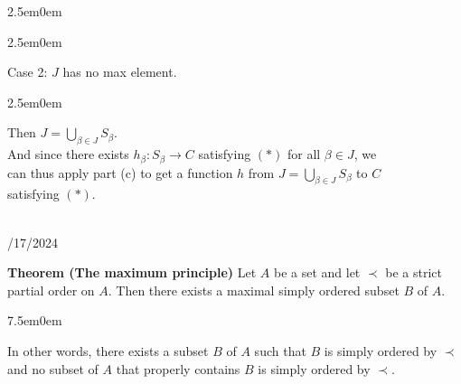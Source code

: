 \documentclass{book}
\newcommand{\hOne}{%
   \color{Black}%
   \fontsize{14}{16}\selectfont%
}
\newcommand{\hThree}{%
   \color{Black}%
   \fontsize{12}{14}\selectfont%
}
\newenvironment{myIndent}{%
   \begin{adjustwidth}{2.5em}{0em}%
}{%
   \end{adjustwidth}%
}
\newenvironment{myTindent}{%
   \begin{adjustwidth}{7.5em}{0em}%
}{%
   \end{adjustwidth}%
}
\newcommand{\blab}[1]{\textbf{#1}}
\newcommand{\mySepTwo}[1][.]{%
   {\noindent\color{#1}{\rule{6.5in}{0.5mm}}}\\%
}
\newcommand{\retTwo}{\hfill\bigbreak}
\newcommand{\dispDate}[1]{{
   \color{Black}%
   \fontsize{20}{18}\selectfont%
   #1\retTwo
}}
\begin{document}
\begin{myIndent}
\begin{itemize}
\begin{myIndent}
            Case 2: $J$ has no max element.
            \begin{myIndent}
               Then $J = \bigcup\limits_{\beta \in J}S_\beta$.\\ And since there exists $h_\beta: S_\beta \longrightarrow C$ satisfying $(*)$ for all $\beta \in J$, we\\ can thus apply part (c) to get a function $h$ from $J = \bigcup\limits_{\beta \in J}S_\beta$ to $C$\\ [-9pt] satisfying $(*)$.\retTwo\retTwo
            \end{myIndent}
         \end{myIndent}
      \end{itemize}
   \end{myIndent}

   \hOne
   \mySepTwo

   \dispDate{9/17/2024}

   \blab{Theorem (The maximum principle)} Let $A$ be a set and let $\prec$ be a strict partial order on $A$. Then there exists a maximal simply ordered subset $B$ of $A$.
   
   \begin{myTindent}\hThree
      In other words, there exists a subset $B$ of $A$ such that $B$ is simply ordered by $\prec$ and no subset of $A$ that properly contains $B$ is simply ordered by $\prec$.\retTwo
   \end{myTindent}
   
\end{document}
